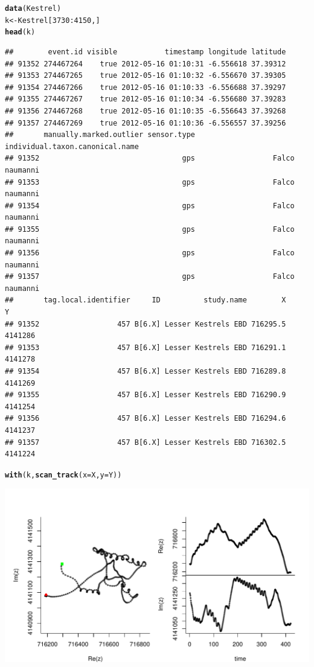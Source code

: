 \documentclass[10pt]{article}\usepackage[]{graphicx}\usepackage[]{color}
\makeatletter
\def\maxwidth{ %
  \ifdim\Gin@nat@width>\linewidth
    \linewidth
  \else
    \Gin@nat@width
  \fi
}
\newcommand{\hlnum}[1]{\textcolor[rgb]{0.686,0.059,0.569}{#1}}%
\newcommand{\hlopt}[1]{\textcolor[rgb]{0,0,0}{#1}}%
\newcommand{\hlstd}[1]{\textcolor[rgb]{0.345,0.345,0.345}{#1}}%
\newcommand{\hlkwb}[1]{\textcolor[rgb]{0.69,0.353,0.396}{#1}}%
\newcommand{\hlkwc}[1]{\textcolor[rgb]{0.333,0.667,0.333}{#1}}%
\newcommand{\hlkwd}[1]{\textcolor[rgb]{0.737,0.353,0.396}{\textbf{#1}}}%
\newenvironment{kframe}{%
 \def\at@end@of@kframe{}%
 \ifinner\ifhmode%
  \def\at@end@of@kframe{\end{minipage}}%
  \begin{minipage}{\columnwidth}%
 \fi\fi%
 \def\FrameCommand##1{\hskip\@totalleftmargin \hskip-\fboxsep
 \colorbox{shadecolor}{##1}\hskip-\fboxsep
     \hskip-\linewidth \hskip-\@totalleftmargin \hskip\columnwidth}%
 \MakeFramed {\advance\hsize-\width
   \@totalleftmargin\z@ \linewidth\hsize
   \@setminipage}}%
 {\par\unskip\endMakeFramed%
 \at@end@of@kframe}
\newenvironment{knitrout}{}{} %
\makeatother
\begin{document}
\begin{knitrout}
\color{fgcolor}\begin{kframe}
\begin{alltt}
\hlkwd{data}\hlstd{(Kestrel)}
\hlstd{k} \hlkwb{<-} \hlstd{Kestrel[}\hlnum{3730}\hlopt{:}\hlnum{4150}\hlstd{,]}
\hlkwd{head}\hlstd{(k)}
\end{alltt}
\begin{verbatim}
##        event.id visible           timestamp longitude latitude
## 91352 274467264    true 2012-05-16 01:10:31 -6.556618 37.39312
## 91353 274467265    true 2012-05-16 01:10:32 -6.556670 37.39305
## 91354 274467266    true 2012-05-16 01:10:33 -6.556688 37.39297
## 91355 274467267    true 2012-05-16 01:10:34 -6.556680 37.39283
## 91356 274467268    true 2012-05-16 01:10:35 -6.556643 37.39268
## 91357 274467269    true 2012-05-16 01:10:36 -6.556557 37.39256
##       manually.marked.outlier sensor.type individual.taxon.canonical.name
## 91352                                 gps                  Falco naumanni
## 91353                                 gps                  Falco naumanni
## 91354                                 gps                  Falco naumanni
## 91355                                 gps                  Falco naumanni
## 91356                                 gps                  Falco naumanni
## 91357                                 gps                  Falco naumanni
##       tag.local.identifier     ID          study.name        X       Y
## 91352                  457 B[6.X] Lesser Kestrels EBD 716295.5 4141286
## 91353                  457 B[6.X] Lesser Kestrels EBD 716291.1 4141278
## 91354                  457 B[6.X] Lesser Kestrels EBD 716289.8 4141269
## 91355                  457 B[6.X] Lesser Kestrels EBD 716290.9 4141254
## 91356                  457 B[6.X] Lesser Kestrels EBD 716294.6 4141237
## 91357                  457 B[6.X] Lesser Kestrels EBD 716302.5 4141224
\end{verbatim}
\begin{alltt}
\hlkwd{with}\hlstd{(k,} \hlkwd{scan_track}\hlstd{(}\hlkwc{x}\hlstd{=X,} \hlkwc{y}\hlstd{=Y))}
\end{alltt}
\end{kframe}
\includegraphics[width=\maxwidth]{figure/subsetKestrel-1} 

\end{knitrout}
\end{document}
